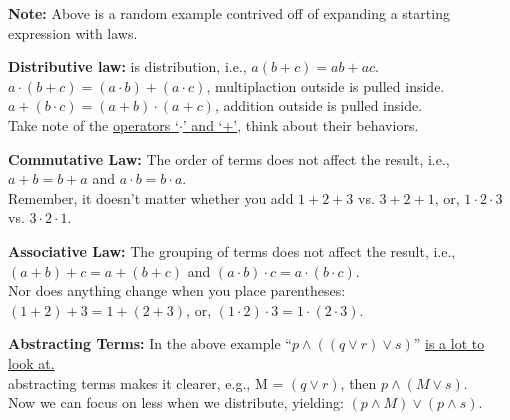 \begin{Note}
    \textbf{Note:} Above is a random example contrived off of expanding a starting expression with laws.
\end{Note}
\vspace{-1em}
\begin{Tip}
    \textbf{Distributive law:} is distribution, i.e., $a(b+c) = ab + ac$.\\

    \noindent
    $a \cdot  (b+c) = (a\cdot b) + (a\cdot c)$, multiplaction outside is pulled inside.\\
    $a+(b\cdot c) = (a+b) \cdot  (a+c)$, addition outside is pulled inside.\\

    \noindent
    Take note of the \underline{operators `$\cdot$' and `+'}, think about their behaviors.\\
\end{Tip}

\newpage

\begin{Tip}
    \textbf{Commutative Law:} The order of terms does not affect the result, i.e.,\\
    $a + b = b + a$ and $a \cdot b = b \cdot a$.\\

    \noindent
    Remember, it doesn't matter whether you add $1 + 2 + 3$ vs. $3 + 2 + 1$, or, $1 \cdot 2 \cdot 3$ vs. $3 \cdot 2 \cdot 1$.\\
\end{Tip}
\begin{Tip}
    \textbf{Associative Law:} The grouping of terms does not affect the result, i.e.,\\
    $(a + b) + c = a + (b + c)$ and $(a \cdot b) \cdot c = a \cdot (b \cdot c)$.\\

    \noindent
    Nor does anything change when you place parentheses:\\
    $(1 + 2) + 3 = 1 + (2 + 3)$, or, $(1 \cdot 2) \cdot 3 = 1 \cdot (2 \cdot 3)$.\\
\end{Tip}

\begin{Tip}
    \textbf{Abstracting Terms:} In the above example ``$p \land ((q \lor r) \lor s) $'' \underline{is a lot to look at.}\\
    abstracting terms makes it clearer, e.g., M = $(q \lor r)$, then $p \land (M \lor s)$.\\

    \noindent
    Now we can focus on less when we distribute, yielding: $(p \land M) \lor (p \land s)$.\\
\end{Tip}

